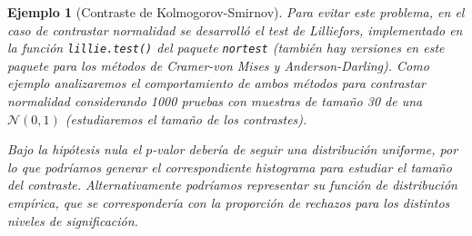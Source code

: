 \documentclass[
]{book}
\newenvironment{Shaded}{\begin{snugshade}}{\end{snugshade}}
\newcommand{\CommentTok}[1]{\textcolor[rgb]{0.56,0.35,0.01}{\textit{#1}}}
\newcommand{\ControlFlowTok}[1]{\textcolor[rgb]{0.13,0.29,0.53}{\textbf{#1}}}
\newcommand{\DecValTok}[1]{\textcolor[rgb]{0.00,0.00,0.81}{#1}}
\newcommand{\FunctionTok}[1]{\textcolor[rgb]{0.00,0.00,0.00}{#1}}
\newcommand{\NormalTok}[1]{#1}
\newcommand{\OtherTok}[1]{\textcolor[rgb]{0.56,0.35,0.01}{#1}}
\newcommand{\SpecialCharTok}[1]{\textcolor[rgb]{0.00,0.00,0.00}{#1}}
\newcommand{\StringTok}[1]{\textcolor[rgb]{0.31,0.60,0.02}{#1}}
\theoremstyle{break}
\newtheorem{example}{Ejemplo}[chapter]
\theoremstyle{nonumberplain}
\renewcommand{\CommentTok}[1]{\textcolor[rgb]{0.41,0.41,0.41}{\texttt{#1}}}
\begin{document}
\begin{example}[Contraste de Kolmogorov-Smirnov]
Para evitar este problema, en el caso de contrastar normalidad se desarrolló el test
de Lilliefors, implementado en la función \texttt{lillie.test()} del paquete \texttt{nortest}
(también hay versiones en este paquete para los métodos de Cramer-von Mises y
Anderson-Darling). Como ejemplo analizaremos el comportamiento de ambos métodos
para contrastar normalidad considerando 1000 pruebas con muestras de tamaño 30 de
una \(\mathcal{N}(0,1)\) (estudiaremos el \emph{tamaño de los contrastes}).

\begin{Shaded}
\end{Shaded}

Bajo la hipótesis nula el \(p\)-valor debería de seguir una distribución uniforme,
por lo que podríamos generar el correspondiente histograma para estudiar el
tamaño del contraste. Alternativamente podríamos representar su función de
distribución empírica, que se correspondería con la proporción de rechazos
para los distintos niveles de significación.


\end{example}
\end{document}

